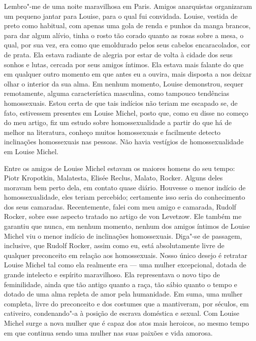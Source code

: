 Lembro"-me de uma noite maravilhosa em Paris. Amigos anarquistas
organizaram um pequeno jantar para Louise, para o qual fui convidada.
Louise, vestida de preto como habitual, com apenas uma gola de renda e
punhos da manga brancos, para dar algum alívio, tinha o rosto tão corado
quanto as rosas sobre a mesa, o qual, por sua vez, era como que
emoldurado pelos seus cabelos encaracolados, cor de prata. Ela estava
radiante de alegria por estar de volta à cidade dos seus sonhos e lutas,
cercada por seus amigos íntimos. Ela estava mais falante do que em
qualquer outro momento em que antes eu a ouvira, mais disposta a nos
deixar olhar o interior da sua alma. Em nenhum momento, Louise
demonstrou, sequer remotamente, alguma característica masculina, como
tampouco tendências homossexuais. Estou certa de que tais indícios não
teriam me escapado se, de fato, estivessem presentes em Louise Michel,
posto que, como eu disse no começo do meu artigo, fiz um estudo sobre
homossexualidade a partir do que há de melhor na literatura, conheço muitos
homossexuais e facilmente detecto inclinações homossexuais nas pessoas.
Não havia vestígios de homossexualidade em Louise Michel.

Entre os amigos de Louise Michel estavam os maiores homens do seu tempo:
Piotr Kropotkin, Malatesta, Elisée Reclus, Malato, Rocker. Alguns deles
moravam bem perto dela, em contato quase diário. Houvesse o menor
indício de homossexualidade, eles teriam percebido; certamente isso
seria do conhecimento dos seus camaradas. Recentemente, falei com meu
amigo e camarada, Rudolf Rocker, sobre esse aspecto tratado no artigo de
von Levetzow. Ele também me garantiu que nunca, em nenhum momento,
nenhum dos amigos íntimos de Louise Michel viu o menor indício de
inclinações homossexuais. Diga"-se de passagem, inclusive, que Rudolf
Rocker, assim como eu, está absolutamente livre de qualquer preconceito
em relação aos homossexuais. Nosso único desejo é retratar Louise Michel
tal como ela realmente era --- uma mulher excepcional, dotada de grande
intelecto e espírito maravilhoso. Ela representava o novo tipo de
feminilidade, ainda que tão antigo quanto a raça, tão sábio quanto o
tempo e dotado de uma alma repleta de amor pela humanidade. Em suma, uma
mulher completa, livre do preconceito e dos costumes que a mantiveram, por séculos, em cativeiro, condenando"-a à posição de escrava
doméstica e sexual. Com Louise Michel surge a nova mulher que é capaz
dos atos mais heroicos, ao mesmo tempo em que continua sendo uma mulher
nas suas paixões e vida amorosa.

